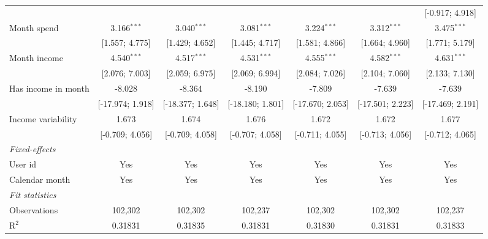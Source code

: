 \begin{table}[htbp]
\begin{threeparttable}[b]
\begin{tabular}{lcccccc}
                                    &                  &                  &                  &                  &                  & [-0.917; 4.918]\\   
         Month spend                & 3.166$^{***}$    & 3.040$^{***}$    & 3.081$^{***}$    & 3.224$^{***}$    & 3.312$^{***}$    & 3.475$^{***}$\\   
                                    & [1.557; 4.775]   & [1.429; 4.652]   & [1.445; 4.717]   & [1.581; 4.866]   & [1.664; 4.960]   & [1.771; 5.179]\\   
         Month income               & 4.540$^{***}$    & 4.517$^{***}$    & 4.531$^{***}$    & 4.555$^{***}$    & 4.582$^{***}$    & 4.631$^{***}$\\   
                                    & [2.076; 7.003]   & [2.059; 6.975]   & [2.069; 6.994]   & [2.084; 7.026]   & [2.104; 7.060]   & [2.133; 7.130]\\   
         Has income in month        & -8.028           & -8.364           & -8.190           & -7.809           & -7.639           & -7.639\\   
                                    & [-17.974; 1.918] & [-18.377; 1.648] & [-18.180; 1.801] & [-17.670; 2.053] & [-17.501; 2.223] & [-17.469; 2.191]\\   
         Income variability         & 1.673            & 1.674            & 1.676            & 1.672            & 1.672            & 1.677\\   
                                    & [-0.709; 4.056]  & [-0.709; 4.058]  & [-0.707; 4.058]  & [-0.711; 4.055]  & [-0.713; 4.056]  & [-0.712; 4.065]\\   
         \midrule
         \emph{Fixed-effects}\\
         User id                    & Yes              & Yes              & Yes              & Yes              & Yes              & Yes\\  
         Calendar month             & Yes              & Yes              & Yes              & Yes              & Yes              & Yes\\  
         \midrule
         \emph{Fit statistics}\\
         Observations               & 102,302          & 102,302          & 102,237          & 102,302          & 102,302          & 102,237\\  
         R$^2$                      & 0.31831          & 0.31835          & 0.31831          & 0.31830          & 0.31831          & 0.31833\\  

\end{tabular}
\end{threeparttable}
\end{table}
